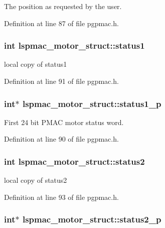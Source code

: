 The position as requested by the user. 

Definition at line 87 of file pgpmac.h.\hypertarget{structlspmac__motor__struct_acb52b612b9237e8eec0b97fb1e76a35d}{
\subsubsection[{status1}]{\setlength{\rightskip}{0pt plus 5cm}int {\bf lspmac\_\-motor\_\-struct::status1}}}
\label{structlspmac__motor__struct_acb52b612b9237e8eec0b97fb1e76a35d}


local copy of status1 

Definition at line 91 of file pgpmac.h.\hypertarget{structlspmac__motor__struct_a56c41875faf19c643e97c10519e6eb8c}{
\subsubsection[{status1\_\-p}]{\setlength{\rightskip}{0pt plus 5cm}int$\ast$ {\bf lspmac\_\-motor\_\-struct::status1\_\-p}}}
\label{structlspmac__motor__struct_a56c41875faf19c643e97c10519e6eb8c}


First 24 bit PMAC motor status word. 

Definition at line 90 of file pgpmac.h.\hypertarget{structlspmac__motor__struct_a6a412224c09268c1dc92de9c2a1a2512}{
\subsubsection[{status2}]{\setlength{\rightskip}{0pt plus 5cm}int {\bf lspmac\_\-motor\_\-struct::status2}}}
\label{structlspmac__motor__struct_a6a412224c09268c1dc92de9c2a1a2512}


local copy of status2 

Definition at line 93 of file pgpmac.h.\hypertarget{structlspmac__motor__struct_a2b33ef6e12717459c1e9967cc6e659c6}{
\subsubsection[{status2\_\-p}]{\setlength{\rightskip}{0pt plus 5cm}int$\ast$ {\bf lspmac\_\-motor\_\-struct::status2\_\-p}}}
\label{structlspmac__motor__struct_a2b33ef6e12717459c1e9967cc6e659c6}


